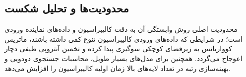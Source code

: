 \subsection{محدودیت‌ها و تحلیل شکست}
محدودیت اصلی روش  وابستگی آن به دقت کالیبراسیون و داده‌های نماینده ورودی است؛ در شرایطی که داده‌های ورودی کالیبراسیون تنوع کمی داشته باشند، ماتریس کوواریانس به زیرفضای کوچکی سوگیری پیدا کرده و تخمین آنتروپی طیفی دچار اعوجاج می‌گردد. همچنین برای مدل‌های بسیار طویل، محاسبات جستجوی دودویی و بهینه‌سازی رتبه در تعداد لایه‌های بالا زمان اولیه کالیبراسیون را افزایش می‌دهد.
